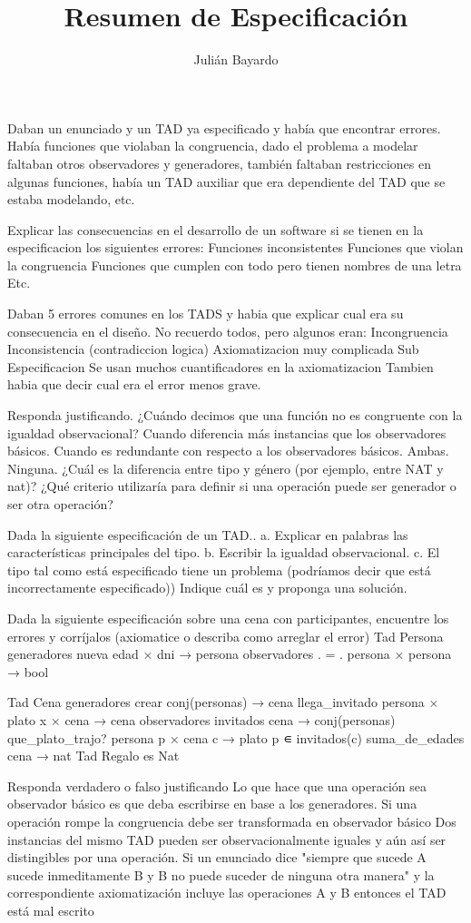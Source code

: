 \documentclass[10pt,a4paper,notitlepage]{article}
\author{Julián Bayardo}
\title{Resumen de Especificación}
\begin{document}
Daban un enunciado y un TAD ya especificado y había que encontrar errores. Había funciones que violaban la congruencia, dado el problema a modelar faltaban otros observadores y generadores, también faltaban restricciones en algunas funciones, había un TAD auxiliar que era dependiente del TAD que se estaba modelando, etc.

Explicar las consecuencias en el desarrollo de un software si se tienen en la especificacion los siguientes errores:
Funciones inconsistentes
Funciones que violan la congruencia
Funciones que cumplen con todo pero tienen nombres de una letra
Etc.

Daban 5 errores comunes en los TADS y habia que explicar cual era su consecuencia en el diseño. No recuerdo todos, pero algunos eran:
Incongruencia
Inconsistencia (contradiccion logica)
Axiomatizacion muy complicada
Sub Especificacion
Se usan muchos cuantificadores en la axiomatizacion
Tambien habia que decir cual era el error menos grave.

Responda justificando.
¿Cuándo decimos que una función no es congruente con la igualdad observacional?
Cuando diferencia más instancias que los observadores básicos.
Cuando es redundante con respecto a los observadores básicos.
Ambas.
Ninguna.
¿Cuál es la diferencia entre tipo y género (por ejemplo, entre NAT y nat)?
¿Qué criterio utilizaría para definir si una operación puede ser generador o ser otra operación?

Dada la siguiente especificación de un TAD..
a. Explicar en palabras las características principales del tipo.
b. Escribir la igualdad observacional.
c. El tipo tal como está especificado tiene un problema (podríamos decir que está incorrectamente especificado)) Indique cuál es y proponga una solución.

Dada la siguiente especificación sobre una cena con participantes, encuentre los errores y corríjalos (axiomatice o describa como arreglar el error)
Tad Persona
generadores
nueva edad × dni → persona
observadores
. = . persona × persona → bool

Tad Cena
generadores
crear conj(personas) → cena
llega_invitado persona × plato x × cena → cena
observadores
invitados cena → conj(personas)
que_plato_trajo? persona p × cena c → plato { p ∊ invitados(c) }
suma_de_edades cena → nat
Tad Regalo es Nat

Responda verdadero o falso justificando
Lo que hace que una operación sea observador básico es que deba escribirse en base a los generadores.
Si una operación rompe la congruencia debe ser transformada en observador básico
Dos instancias del mismo TAD pueden ser observacionalmente iguales y aún así ser distingibles por una operación.
Si un enunciado dice "siempre que sucede A sucede inmeditamente B y B no puede suceder de ninguna otra manera" y la correspondiente axiomatización incluye las operaciones A y B entonces el TAD está mal escrito
\end{document}
